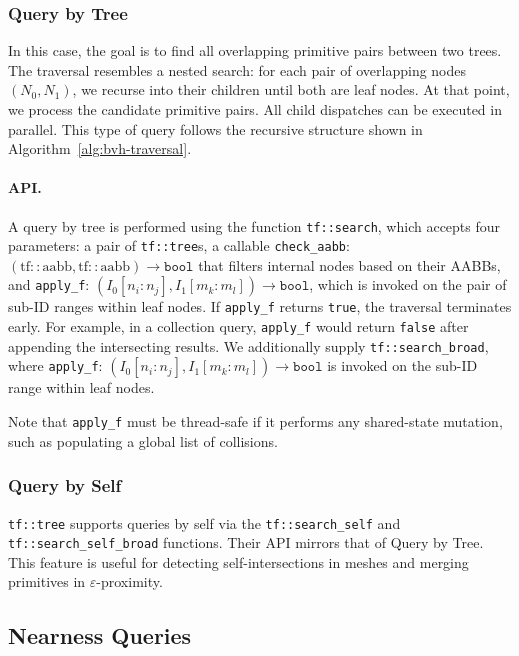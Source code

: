 	{\small }

\subsubsection{Query by Tree}
In this case, the goal is to find all overlapping primitive
pairs between two trees. The traversal resembles a nested
search: for each pair of overlapping nodes $(N_0, N_1)$,
we recurse into their children until both are leaf nodes.
At that point, we process the candidate primitive pairs.
All child dispatches can be executed in parallel.
This type of query follows the recursive structure shown in
Algorithm~\ref{alg:bvh-traversal}. 

\paragraph*{API.}
A query by tree is performed using the function
\texttt{tf::search}, which accepts four parameters:
a pair of \texttt{tf::tree}s, a callable
\texttt{check\_aabb}: $(\mathrm{tf::aabb}, \mathrm{tf::aabb}) \to \texttt{bool}$
that filters internal nodes based on their AABBs,
and \texttt{apply\_f}: $(I_0[n_i:n_j], I_1[m_k:m_l]) \to \texttt{bool}$,
which is invoked on the pair of sub-ID ranges within leaf nodes.
If \texttt{apply\_f} returns \texttt{true}, the traversal
terminates early. For example, in a collection query,
\texttt{apply\_f} would return \texttt{false} after
appending the intersecting results. We additionally
supply \texttt{tf::search\_broad}, where
\texttt{apply\_f}: $(I_0[n_i:n_j], I_1[m_k:m_l]) \to \texttt{bool}$
is invoked on the sub-ID range within leaf nodes.

Note that \texttt{apply\_f} must be thread-safe if it performs
any shared-state mutation, such as populating a global list
of collisions.

\subsubsection{Query by Self}
\texttt{tf::tree} supports queries by self via the
\texttt{tf::search\_self} and 
\texttt{tf::search\_self\_broad} functions. Their API
mirrors that of Query by Tree.
This feature is useful for detecting self-intersections
in meshes and merging primitives in $\varepsilon$-proximity.



\subsection{Nearness Queries}

